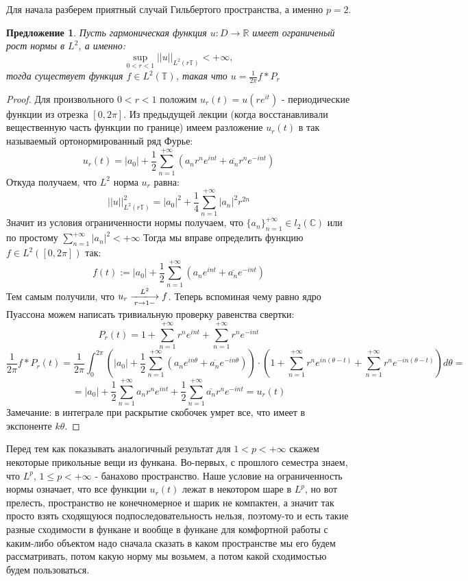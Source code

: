 \documentclass[12pt,a4paper]{article} %
\newtheorem{proposition}{Предложение}
\newcommand{\R}{\mathbb{R}}
\newcommand{\Co}{\mathbb{C}}
\begin{document}
	Для начала разберем приятный случай Гильбертого пространства, а именно $p=2$.
	\begin{proposition}
		Пусть гармоническая функция $u:D\rightarrow\R$ имеет ограниченый рост нормы в $L^2$, а именно:
		$$\sup\limits_{0<r<1}||u||_{L^2(r\mathbb{T})}<+\infty,$$
		тогда существует функция $f\in L^2(\mathbb{T})$, такая что $u=\frac{1}{2\pi}f*P_r$
	\end{proposition}
	\begin{proof}
		Для произвольного $0<r<1$ положим $u_r(t)=u(re^{it})$ - периодические функции из отрезка $[0,2\pi]$. Из предыдущей лекции (когда восстанавливали вещественную часть функции по границе) имеем разложение $u_r(t)$ в так называемый ортонормированный ряд Фурье:
		$$u_r(t)=|a_0|+\frac{1}{2}\sum_{n=1}^{+\infty}(a_nr^ne^{int}+\overline{a_n}r^ne^{-int})$$
		Откуда получаем, что $L^2$ норма $u_r$ равна:
		$$||u||_{L^2(r\mathbb{T})}^2=|a_0|^2+\frac{1}{4}\sum_{n=1}^{+\infty}|a_n|^2r^{2n}$$
		Значит из условия ограниченности нормы получаем, что $\{a_n\}_{n=1}^{+\infty}\in l_2(\Co)$ или по простому $\displaystyle\sum_{n=1}^{+\infty}|a_n|^2<+\infty$
		Тогда мы вправе определить функцию $f\in L^2([0,2\pi])$ так:
		$$f(t):=|a_0|+\frac{1}{2}\sum_{n=1}^{+\infty}(a_ne^{int}+\overline{a_n}e^{-int})$$
		Тем самым получили, что $u_r\xlongrightarrow[r\rightarrow1-]{L^2}f$. Теперь вспоминая чему равно ядро Пуассона можем написать тривиальную проверку равенства свертки:
		$$P_r(t)=1+\sum_{n=1}^{+\infty}r^ne^{int}+\sum_{n=1}^{+\infty}r^ne^{-int}$$
		$$\frac{1}{2\pi}f*P_r(t)=\frac{1}{2\pi}\int_0^{2\pi}\left(|a_0|+\frac{1}{2}\sum_{n=1}^{+\infty}(a_ne^{in\theta}+\overline{a_n}e^{-in\theta})\right)\cdot\left(1+\sum_{n=1}^{+\infty}r^ne^{in(\theta-t)}+\sum_{n=1}^{+\infty}r^ne^{-in(\theta-t)}\right)d\theta=$$
		$$=|a_0|+\frac{1}{2}\sum_{n=1}^{+\infty}a_nr^ne^{int}+\frac{1}{2}\sum_{n=1}^{+\infty}\overline{a_n}r^ne^{-int}=u_r(t)$$
		Замечание: в интеграле при раскрытие скобочек умрет все, что имеет в экспоненте $k\theta$.
	\end{proof}
	Перед тем как показывать аналогичный результат для $1<p<+\infty$ скажем некоторые прикольные вещи из функана. Во-первых, с прошлого семестра знаем, что $L^p,\,1\leq p<+\infty$ - банахово пространство. Наше условие на ограниченность нормы означает, что все функции $u_r(t)$ лежат в некотором шаре в $L^p$, но вот прелесть, пространство не конечномерное и шарик не компактен, а значит так просто взять сходящуюся подпоследовательность нельзя, поэтому-то и есть такие разные сходимости в функане и вообще в функане для комфортной работы с каким-либо объектом надо сначала сказать в каком пространстве мы его будем рассматривать, потом какую норму мы возьмем, а потом какой сходимостью будем пользоваться.
\end{document}

